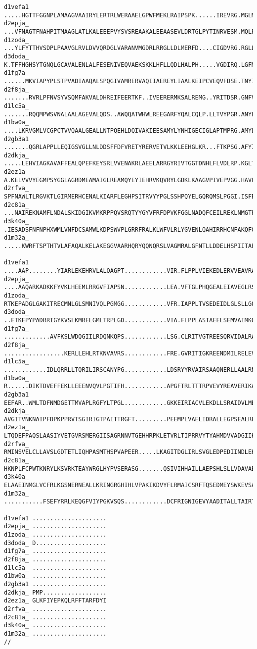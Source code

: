 \begin{lstlisting}[basicstyle=\scriptsize\ttfamily, caption=MSA c.67.1,label=abbMSA67]
d1vefa1 .....HGTTFGGNPLAMAAGVAAIRYLERTRLWERAAELGPWFMEKLRAIPSPK......IREVRG.MGLMVGLELKEK.
d2epja_ ...VFNAGTFNAHPITMAAGLATLKALEEEPVYSVSREAAKALEEAASEVLDRTGLPYTINRVESM.MQLFIGVEEVSN.
d1zoda_ ...YLFYTTHVSDPLPAAVGLRVLDVVQRDGLVARANVMGDRLRRGLLDLMERFD....CIGDVRG.RGLLLGVEIVKDR
d3doda_ K.TFFHGHSYTGNQLGCAVALENLALFESENIVEQVAEKSKKLHFLLQDLHALPH.....VGDIRQ.LGFMCGAELVRSK
d1fg7a_ ......MKVIAPYPLSTPVADIAAQALSPQGIVAMRERVAQIIAEREYLIAALKEIPCVEQVFDSE.TNYILARFKASS.
d2f8ja_ .......RVRLPFNVSYVSQMFAKVALDHREIFEERTKF..IVEERERMKSALREMG..YRITDSR.GNFVFVFMEKEE.
d1lc5a_ .......RQQMPWSVNALAALAGEVALQDS..AWQQATWHWLREEGARFYQALCQLP.LLTVYPGR.ANYLLLRCERED.
d1bw0a_ ....LKRVGMLVCGPCTVVQAALGEALLNTPQEHLDQIVAKIEESAMYLYNHIGECIGLAPTMPRG.AMYLMSRIDLEKY
d2gb3a1 .......QGRLAPPLLEQIGSVGLLNLDDSFFDFVRETYRERVETVLKKLEEHGLKR...FTKPSG.AFYITAELPVEDA
d2dkja_ .....LEHVIAGKAVAFFEALQPEFKEYSRLVVENAKRLAEELARRGYRIVTGGTDNHLFLVDLRP.KGLTGKEAEERLD
d2ez1a_ A.KELVVVYEGMPSYGGLAGRDMEAMAIGLREAMQYEYIEHRVKQVRYLGDKLKAAGVPIVEPVGG.HAVFLDARRFCEH
d2rfva_ SPFNAWLTLRGVKTLGIRMERHCENALKIARFLEGHPSITRVYYPGLSSHPQYELGQRQMSLPGGI.ISFEIAGGLEAGR
d2c81a_ ...NAIREKNAMFLNDALSKIDGIKVMKRPPQVSRQTYYGYVFRFDPVKFGGLNADQFCEILREKLNMGTFYLHPPYLPV
d3k40a_ .IESADSFNFNPHXWMLVNFDCSAMWLKDPSWVPLGRRFRALKLWFVLRLYGVENLQAHIRRHCNFAKQFGDLCVADSRF
d1m32a_ .....KWRFTSPTHTVLAFAQALKELAKEGGVAARHQRYQQNQRSLVAGMRALGFNTLLDDELHSPIITAFYSPEDPQYR

d1vefa1 ....AAP........YIARLEKEHRVLALQAGPT............VIR.FLPPLVIEKEDLERVVEAVRAVLA......
d2epja_ ....AAQARKADKKFYVKLHEEMLRRGVFIAPSN............LEA.VFTGLPHQGEALEIAVEGLRSSLKTVLGS.
d1zoda_ RTKEPADGLGAKITRECMNLGLSMNIVQLPGMGG............VFR.IAPPLTVSEDEIDLGLSLLGQAIERAL...
d3doda_ ..ETKEPYPADRRIGYKVSLKMRELGMLTRPLGD............VIA.FLPPLASTAEELSEMVAIMKQAIHEVTSLE
d1fg7a_ .............AVFKSLWDQGIILRDQNKQPS............LSG.CLRITVGTREESQRVIDALRAEQV......
d2f8ja_ .................KERLLEHLRTKNVAVRS............FRE.GVRITIGKREENDMILRELEVF........
d1lc5a_ ............IDLQRRLLTQRILIRSCANYPG............LDSRYYRVAIRSAAQNERLLAALRNVL.......
d1bw0a_ R......DIKTDVEFFEKLLEEENVQVLPGTIFH............APGFTRLTTTRPVEVYREAVERIKAFCQRHAA..
d2gb3a1 EEFAR..WMLTDFNMDGETTMVAPLRGFYLTPGL............GKKEIRIACVLEKDLLSRAIDVLMEGLKMFCS..
d2dkja_ AVGITVNKNAIPFDPKPPRVTSGIRIGTPAITTRGFT.........PEEMPLVAELIDRALLEGPSEALREEVRRLALAH
d2ez1a_ LTQDEFPAQSLAASIYVETGVRSMERGIISAGRNNVTGEHHRPKLETVRLTIPRRVYTYAHMDVVADGIIKLYQHKEDIR
d2rfva_ RMINSVELCLLAVSLGDTETLIQHPASMTHSPVAPEER.....LKAGITDGLIRLSVGLEDPEDIINDLEHAIRKAT...
d2c81a_ HKNPLFCPWTKNRYLKSVRKTEAYWRGLHYPVSERASG.......QSIVIHHAILLAEPSHLSLLVDAVAELARKFCV..
d3k40a_ ELAAEINMGLVCFRLKGSNERNEALLKRINGRGHIHLVPAKIKDVYFLRMAICSRFTQSEDMEYSWKEVSAAADEMEQEQ
d1m32a_ ...........FSEFYRRLKEQGFVIYPGKVSQS............DCFRIGNIGEVYAADITALLTAIRTAMYWT....

d1vefa1 .....................
d2epja_ .....................
d1zoda_ .....................
d3doda_ D....................
d1fg7a_ .....................
d2f8ja_ .....................
d1lc5a_ .....................
d1bw0a_ .....................
d2gb3a1 .....................
d2dkja_ PMP..................
d2ez1a_ GLKFIYEPKQLRFFTARFDYI
d2rfva_ .....................
d2c81a_ .....................
d3k40a_ .....................
d1m32a_ .....................
//


\end{lstlisting}